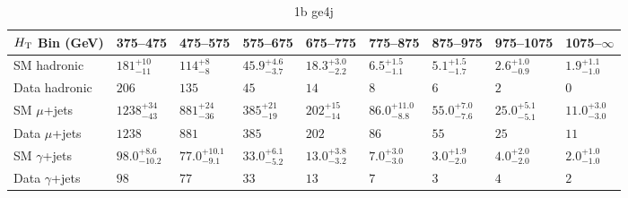 \documentclass[8pt]{article}
\def\scalht{\mbox{$H_{\rm{T}}$}\xspace}
\newcommand\T{\rule{0pt}{2.6ex}}
\newcommand\B{\rule[-1.2ex]{0pt}{0pt}}
\begin{document}
\begin{table}[ht!]
\caption{1b ge4j}
\label{tab:ensemble-1b ge4j}
\centering
\begin{tabular}{ lllllllll }

\hline
\scalht Bin (GeV)       & 375--475                       & 475--575                       & 575--675                       & 675--775                       & 775--875                       & 875--975                       & 975--1075                      & 1075--$\infty$                 \\ [1.000000ex]
\hline
SM hadronic\T           & $181^{+10}_{-11}$              & $114^{+8}_{-8}$                & $45.9^{+4.6}_{-3.7}$           & $18.3^{+3.0}_{-2.2}$           & $6.5^{+1.5}_{-1.1}$            & $5.1^{+1.5}_{-1.7}$            & $2.6^{+1.0}_{-0.9}$            & $1.9^{+1.1}_{-1.0}$            \\ 
Data hadronic\B         & $206$                          & $135$                          & $45$                           & $14$                           & $8$                            & $6$                            & $2$                            & $0$                            \\ 
\hline
SM $\mu$+jets\T         & $1238^{+34}_{-43}$             & $881^{+24}_{-36}$              & $385^{+21}_{-19}$              & $202^{+15}_{-14}$              & $86.0^{+11.0}_{-8.8}$          & $55.0^{+7.0}_{-7.6}$           & $25.0^{+5.1}_{-5.1}$           & $11.0^{+3.0}_{-3.0}$           \\ 
Data $\mu$+jets\B       & $1238$                         & $881$                          & $385$                          & $202$                          & $86$                           & $55$                           & $25$                           & $11$                           \\ 
\hline
SM $\gamma$+jets\T      & $98.0^{+8.6}_{-10.2}$          & $77.0^{+10.1}_{-9.1}$          & $33.0^{+6.1}_{-5.2}$           & $13.0^{+3.8}_{-3.2}$           & $7.0^{+3.0}_{-3.0}$            & $3.0^{+1.9}_{-2.0}$            & $4.0^{+2.0}_{-2.0}$            & $2.0^{+1.0}_{-1.0}$            \\ 
Data $\gamma$+jets\B    & $98$                           & $77$                           & $33$                           & $13$                           & $7$                            & $3$                            & $4$                            & $2$                            \\ 
\hline

\end{tabular}
\end{table}
\end{document}
